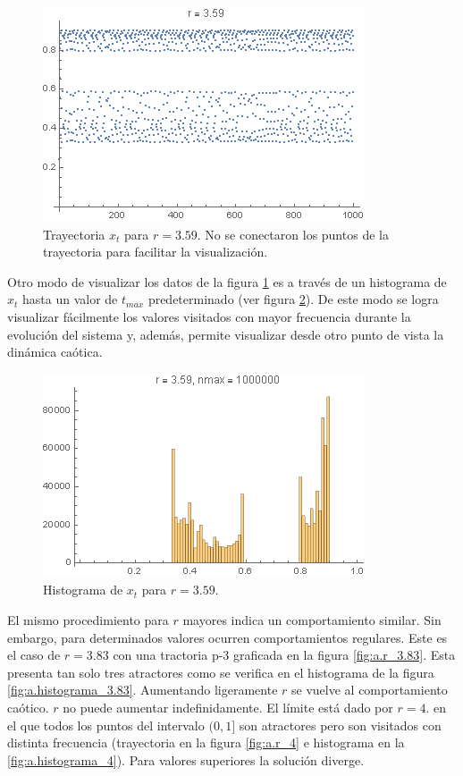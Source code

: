 \documentclass[aps,prb,twocolumn,superscriptaddress,floatfix,longbibliography]{revtex4-2}
\newcounter{para}
\begin{document}
\begin{figure}[htp]
    \includegraphics[clip=true,width=0.7\columnwidth]{a.r_3.59.png}
    \caption{Trayectoria $x_t$ para $r = 3.59$. No se conectaron los puntos de la trayectoria para facilitar la visualización.}
     \label{fig:a.r_3.59}
\end{figure}

Otro modo de visualizar los datos de la figura \ref{fig:a.r_3.59} es a través de un histograma de $x_t$ hasta un valor de $t_{max}$ predeterminado (ver figura  \ref{fig:a.histograma_3.59}). De este modo se logra visualizar fácilmente los valores visitados con mayor frecuencia durante la evolución del sistema y, además, permite visualizar desde otro punto de vista la dinámica caótica.

\begin{figure}[htp]
    \includegraphics[clip=true,width=0.7\columnwidth]{a.histograma_3.59.png}
    \caption{Histograma de $x_t$ para $r = 3.59$.}
     \label{fig:a.histograma_3.59}
\end{figure}


El mismo procedimiento para $r$ mayores indica un comportamiento similar. Sin embargo, para determinados valores ocurren comportamientos regulares. Este es el caso de $r = 3.83$ con una tractoria p-3 graficada en la figura \ref{fig:a.r_3.83}. Esta presenta tan solo tres atractores como se verifica en el histograma de la figura \ref{fig:a.histograma_3.83}. Aumentando ligeramente $r$ se vuelve al comportamiento caótico. $r$ no puede aumentar indefinidamente. El límite está dado por $r = 4.$ en el que todos los puntos del intervalo $(0,1]$ son atractores pero son visitados con distinta frecuencia (trayectoria en la figura \ref{fig:a.r_4} e histograma en la \ref{fig:a.histograma_4}). Para valores superiores la solución diverge.
\end{document}
